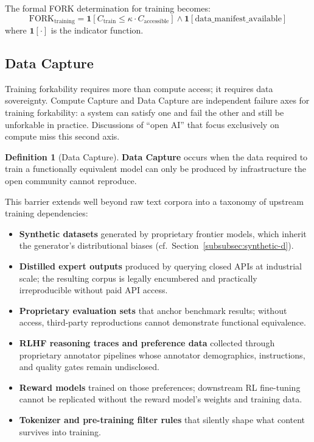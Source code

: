 \documentclass{article}
\theoremstyle{definition}
\newtheorem{definition}{Definition}[section]
\begin{document}
The formal FORK determination for training becomes:
\begin{equation}
\text{FORK}_{\text{training}} = \mathbf{1}[C_{\text{train}} \leq \kappa \cdot C_{\text{accessible}}] \land \mathbf{1}[\text{data\_manifest\_available}]
\end{equation}
where $\mathbf{1}[\cdot]$ is the indicator function.

\subsection{Data Capture}
\label{subsec:data-capture}

Training forkability requires more than compute access; it requires data sovereignty. Compute Capture and Data Capture are independent failure axes for training forkability: a system can satisfy one and fail the other and still be unforkable in practice. Discussions of ``open AI'' that focus exclusively on compute miss this second axis.

\begin{definition}[Data Capture]
\label{def:data-capture}
\textbf{Data Capture} occurs when the data required to train a functionally equivalent model can only be produced by infrastructure the open community cannot reproduce.
\end{definition}

This barrier extends well beyond raw text corpora into a taxonomy of upstream training dependencies:

\begin{itemize}[noitemsep]
    \item \textbf{Synthetic datasets} generated by proprietary frontier models, which inherit the generator's distributional biases (cf.\ Section~\ref{subsubsec:synthetic-d}).
    \item \textbf{Distilled expert outputs} produced by querying closed APIs at industrial scale; the resulting corpus is legally encumbered and practically irreproducible without paid API access.
    \item \textbf{Proprietary evaluation sets} that anchor benchmark results; without access, third-party reproductions cannot demonstrate functional equivalence.
    \item \textbf{RLHF reasoning traces and preference data} collected through proprietary annotator pipelines whose annotator demographics, instructions, and quality gates remain undisclosed.
    \item \textbf{Reward models} trained on those preferences; downstream RL fine-tuning cannot be replicated without the reward model's weights and training data.
    \item \textbf{Tokenizer and pre-training filter rules} that silently shape what content survives into training.
\end{itemize}
\end{document}
